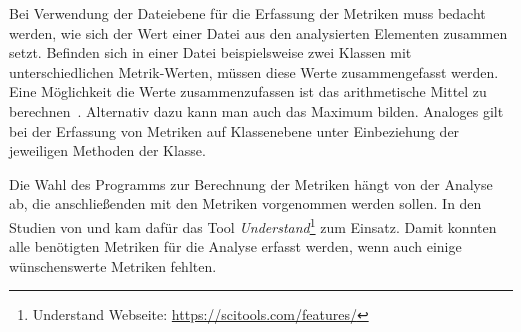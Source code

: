 Bei Verwendung der Dateiebene für die Erfassung der Metriken muss bedacht werden, wie sich der Wert einer Datei aus den analysierten Elementen zusammen setzt.
Befinden sich in einer Datei beispielsweise zwei Klassen mit unterschiedlichen Metrik-Werten, müssen diese Werte zusammengefasst werden.
Eine Möglichkeit die Werte zusammenzufassen ist das arithmetische Mittel zu berechnen~\cite{chowdhury_zulkernine_2009}.
Alternativ dazu kann man auch das Maximum bilden.
Analoges gilt bei der Erfassung von Metriken auf Klassenebene unter Einbeziehung der jeweiligen Methoden der Klasse.

Die Wahl des Programms zur Berechnung der Metriken hängt von der Analyse ab, die anschließenden mit den Metriken vorgenommen werden sollen.
In den Studien von \cite{alves_et_al} und \cite{chowdhury_zulkernine_2009} kam dafür das Tool \emph{Understand}\footnote{Understand Webseite: \url{https://scitools.com/features/}} zum Einsatz.
Damit konnten alle benötigten Metriken für die Analyse erfasst werden, wenn auch einige wünschenswerte Metriken fehlten.
